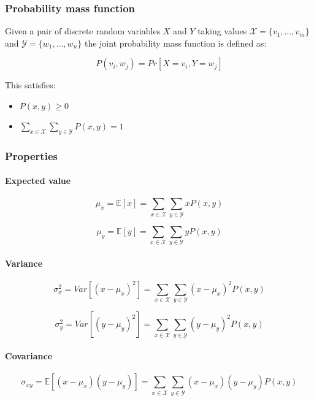 		\subsubsection{Probability mass function}
		Given a pair of discrete random variables $X$ and $Y$ taking values $\mathcal{X} = \{v_1,\dots, v_m\}$ and $\mathcal{Y} = \{w_1, \dots, w_n\}$ the joint probability mass function is defined as:

		$$P(v_i, w_j) = Pr[X = v_i, Y = w_j]$$

		This satisfies:

		\begin{multicols}{2}
			\begin{itemize}
				\item $P(x,y) \ge 0$
				\item $\sum\limits_{x\in\mathcal{X}}\sum\limits_{y\in\mathcal{Y}}P(x,y) = 1$
			\end{itemize}
		\end{multicols}

		\subsubsection{Properties}

			\paragraph{Expected value}

			$$\mu_x = \mathbb{E}[x] = \sum\limits_{x\in\mathcal{X}}\sum\limits_{y\in\mathcal{Y}}xP(x,y)$$

			$$\mu_y = \mathbb{E}[y] = \sum\limits_{x\in\mathcal{X}}\sum\limits_{y\in\mathcal{Y}}yP(x,y)$$

			\paragraph{Variance}

			$$\sigma_x^2 = Var[(x-\mu_x)^2] = \sum\limits_{x\in\mathcal{X}}\sum\limits_{y\in\mathcal{Y}}(x-\mu_x)^2P(x,y)$$

			$$\sigma_y^2 = Var[(y-\mu_y)^2] = \sum\limits_{x\in\mathcal{X}}\sum\limits_{y\in\mathcal{Y}}(y-\mu_y)^2P(x,y)$$

			\paragraph{Covariance}

			$$\sigma_{xy} = \mathbb{E}[(x-\mu_x)(y-\mu_y)] = \sum\limits_{x\in\mathcal{X}}\sum\limits_{y\in\mathcal{Y}}(x-\mu_x)(y-\mu_y)P(x,y)$$

